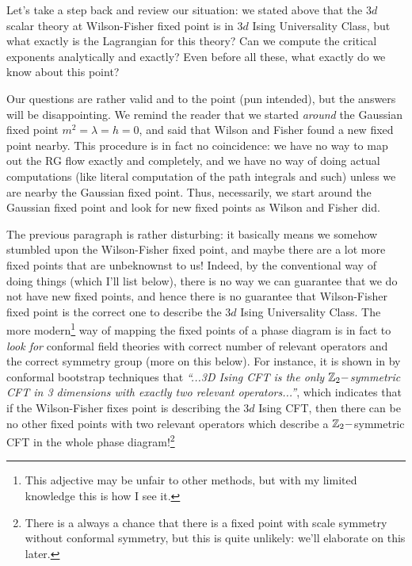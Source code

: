 Let's take a step back and review our situation: we stated above that the $3d$ scalar theory at Wilson-Fisher fixed point is in $3d$ Ising Universality Class, but what exactly is the Lagrangian for this theory? Can we compute the critical exponents analytically and exactly? Even before all these, what exactly do we know about this point?

Our questions are rather valid and to the point (pun intended), but the answers will be disappointing. We remind the reader that we started \emph{around} the Gaussian fixed point $m^2=\lambda=h=0$, and said that Wilson and Fisher found a new fixed point nearby. This procedure is in fact no coincidence: we have no way to map out the RG flow exactly and completely, and we have no way of doing actual computations (like literal computation of the path integrals and such) unless we are nearby the Gaussian fixed point. Thus, necessarily, we start around the Gaussian fixed point and look for new fixed points as Wilson and Fisher did.

The previous paragraph is rather disturbing: it basically means we somehow stumbled upon the Wilson-Fisher fixed point, and maybe there are a lot more fixed points that are unbeknownst to us! Indeed, by the conventional way of doing things (which I'll list below), there is no way we can guarantee that we do not have new fixed points, and hence there is no guarantee that Wilson-Fisher fixed point is the correct one to describe the $3d$ Ising Universality Class. The more modern\footnote{This adjective may be unfair to other methods, but with my limited knowledge this is how I see it.} way of mapping the fixed points of a phase diagram is in fact to \emph{look for} conformal field theories with correct number of relevant operators and the correct symmetry group (more on this below). For instance, it is shown in \cite{Kos:2014bka} by conformal bootstrap techniques that \emph{``...3D Ising CFT is the only $\mathbb{Z}_2-$symmetric CFT in 3 dimensions with exactly two relevant operators...''}, which indicates that if the Wilson-Fisher fixes point is describing the $3d$ Ising CFT, then there can be no other fixed points with two relevant operators which describe a $\mathbb{Z}_2-$symmetric CFT in the whole phase diagram!\footnote{There is a always a chance that there is a fixed point with scale symmetry without conformal symmetry, but this is quite unlikely: we'll elaborate on this later.}

